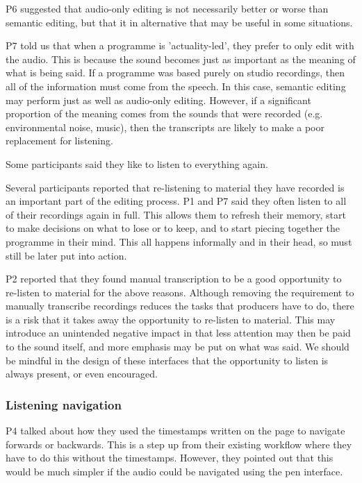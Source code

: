 P6 suggested that audio-only editing is not necessarily better or worse than semantic editing, but that it in
alternative that may be useful in some situations.

P7 told us that when a programme is 'actuality-led', they prefer to only edit with the audio. This is because the sound
becomes just as important as the meaning of what is being said. If a programme was based purely on studio recordings,
then all of the information must come from the speech. In this case, semantic editing may perform just as well as
audio-only editing. However, if a significant proportion of the meaning comes from the sounds that were recorded (e.g.
environmental noise, music), then the transcripts are likely to make a poor replacement for listening.


Some participants said they like to listen to everything again.

Several participants reported that re-listening to material they have recorded is an important part of the editing
process. P1 and P7 said they often listen to all of their recordings again in full. This allows them to refresh their
memory, start to make decisions on what to lose or to keep, and to start piecing together the programme in their mind.
This all happens informally and in their head, so must still be later put into action.

P2 reported that they found manual transcription to be a good opportunity to re-listen to material for the above
reasons. Although removing the requirement to manually transcribe recordings reduces the tasks that producers have to
do, there is a risk that it takes away the opportunity to re-listen to material. This may introduce an unintended
negative impact in that less attention may then be paid to the sound itself, and more emphasis may be put on what was
said. We should be mindful in the design of these interfaces that the opportunity to listen is always present, or even
encouraged.

\subsubsection{Listening navigation}

P4 talked about how they used the timestamps written on the page to navigate forwards or backwards. This is a step up
from their existing workflow where they have to do this without the timestamps. However, they pointed out that this
would be much simpler if the audio could be navigated using the pen interface.

